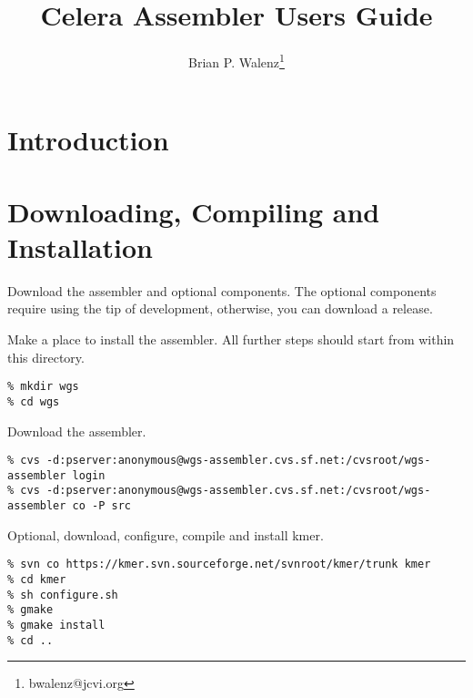 \documentclass[twoside,11pt]{article}
\begin{document}
\pagestyle{fancy}

\rhead[]{}
\lhead[\today]{\today}

\newcommand{\runCA}{{\sc runCA-OBT.pl}}

\normalem

\title{Celera Assembler Users Guide}
\author{Brian P. Walenz\thanks{bwalenz@jcvi.org}}

\maketitle


\section{Introduction}
\label{chap:intro}

\section{Downloading, Compiling and Installation}
\label{chap:build}

Download the assembler and optional components.  The optional
components require using the tip of development, otherwise, you can
download a release.

Make a place to install the assembler.  All further steps should start
from within this directory.

\begin{verbatim}
% mkdir wgs
% cd wgs
\end{verbatim}

Download the assembler.

\begin{verbatim}
% cvs -d:pserver:anonymous@wgs-assembler.cvs.sf.net:/cvsroot/wgs-assembler login
% cvs -d:pserver:anonymous@wgs-assembler.cvs.sf.net:/cvsroot/wgs-assembler co -P src
\end{verbatim}

Optional, download, configure, compile and install kmer.

\begin{verbatim}
% svn co https://kmer.svn.sourceforge.net/svnroot/kmer/trunk kmer
% cd kmer
% sh configure.sh
% gmake
% gmake install
% cd ..
\end{verbatim}
\end{document}
